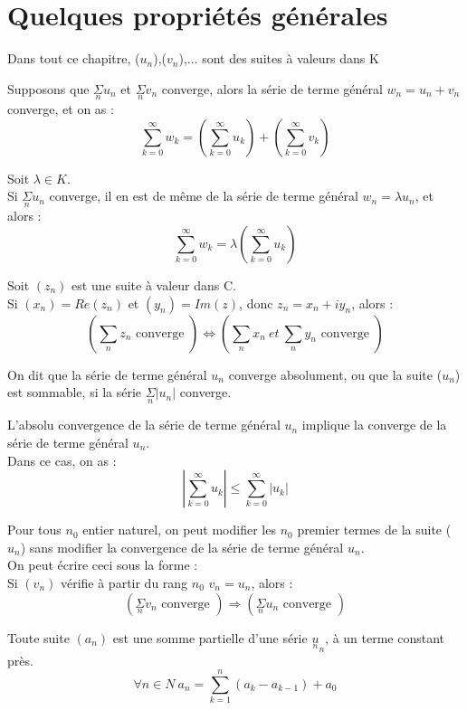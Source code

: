 \section{Quelques propriétés générales}
Dans tout ce chapitre, ($u_n$),($v_n$),... sont des suites à valeurs dans K
\begin{prop}
Supposons que $\underset{n}\Sigma u_n$ et $\underset{n}\Sigma v_n$ converge, alors la série de terme général $w_n = u_n + v_n$ converge, et on as :
$$\sum_{k = 0 }^{\infty} w_k = \left(\sum_{k = 0 }^{\infty} u_k\right) + \left(\sum_{k = 0 }^{\infty} v_k\right)$$
\end{prop}
\begin{prop}
Soit $\lambda \in K$.\\
Si $\underset{n}\Sigma u_n$ converge, il en est de même de la série de terme général $w_n = \lambda u_n$, et alors : 
$$\sum_{k = 0 }^{\infty} w_k = \lambda\left(\sum_{k = 0 }^{\infty} u_k\right)$$
\end{prop}
\begin{prop}
Soit $(z_n)$ est une suite à valeur dans C.\\
Si $(x_n) = Re(z_n)$ et $(y_n)= Im(z)$, donc $z_n = x_n + iy_n$, alors : 
$$(\underset{n}\sum z_n \mbox{ converge }) \Leftrightarrow (\sum_n x_n~ et~ \sum_n y_n \mbox{ converge })$$
\end{prop}
\begin{de}
On dit que la série de terme général $u_n$ converge absolument, ou que la suite ($u_n$) est sommable, si la série $\underset{n}\Sigma |u_n|$ converge.
\end{de}
\begin{theo}
L'absolu convergence de la série de terme général $u_n$ implique la converge de la série de terme général $u_n$.\\
Dans ce cas, on as : 
$$|\sum_{k=0}^{\infty} u_k| \leq \sum_{k=0}^{\infty} |u_k|$$
\end{theo}
\begin{prop}
Pour tous $n_0$ entier naturel, on peut modifier les $n_0$ premier termes de la suite ($u_n$) sans modifier la convergence de la série de terme général $u_n$.\\
On peut écrire ceci sous la forme :\\
Si $(v_n)$ vérifie à partir du rang $n_0$ $v_n = u_n$, alors :
$$(\underset{n}\Sigma v_n \mbox{ converge }) \Rightarrow (\underset{n}\Sigma u_n \mbox{ converge })$$
\end{prop}
\begin{prop}
Toute suite $(a_n)$ est une somme partielle d'une série $\underset{n} u_n$, à un terme constant près.
$$\forall n \in N ~a_n = \sum_{k=1}^n (a_k -a_{k-1}) + a_0$$
\end{prop}
